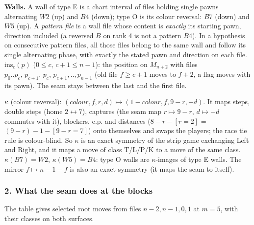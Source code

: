 \textbf{Walls.} A wall of type E is a chart interval of files holding single pawns alternating $W2$ (up) and $B4$ (down); type O is its colour reversal: $B7$ (down) and $W5$ (up). A \emph{pattern file} is a wall file whose content is \emph{exactly} its starting pawn, direction included (a reversed $B$ on rank 4 is not a pattern $B4$). In a hypothesis on consecutive pattern files, all those files belong to the same wall and follow its single alternating phase, with exactly the stated pawn and direction on each file. $\mathrm{ins}_c(p)$ ($0\le c$, $c+1\le n-1$): the position on $M_{n+2}$ with files $p_0..p_c,\,p_{c+1},\,p_c,\,p_{c+1},..,p_{n-1}$ (old file $f\ge c+1$ moves to $f+2$, a flag moves with its pawn). The seam stays between the last and the first file.

\textbf{$\kappa$} (colour reversal): $(colour,f,r,d)\mapsto(1-colour,f,9-r,-d)$. It maps steps, double steps (home $2\leftrightarrow7$), captures (the seam map $r\mapsto9-r$, $d\mapsto-d$ commutes with it), blockers, e.p. and distances ($8-r-[r=2]$ = $(9-r)-1-[9-r=7]$) onto themselves and swaps the players; the race tie rule is colour-blind. So $\kappa$ is an exact symmetry of the strip game exchanging Left and Right, and it maps a move of class T/L/P/K to a move of the same class. $\kappa(B7)=W2$, $\kappa(W5)=B4$: type O walls are $\kappa$-images of type E walls. The mirror $f\mapsto n-1-f$ is also an exact symmetry (it maps the seam to itself).

\subsubsection*{2. What the seam does at the blocks}
The table gives selected root moves from files $n-2,n-1,0,1$ at $m=5$, with their classes on both surfaces.

